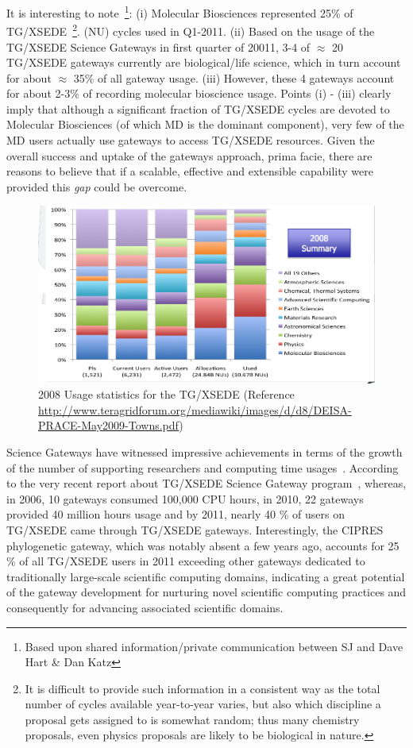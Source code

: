 \documentclass[]{svjour3}
\begin{document}
It is interesting to note~\footnote{Based upon shared
  information/private communication between SJ and Dave Hart \& Dan
  Katz}: (i) Molecular Biosciences represented 25\% of
TG/XSEDE~\footnote{It is difficult to provide such information in a
  consistent way as the total number of cycles available year-to-year
  varies, but also which discipline a proposal gets assigned to is
  somewhat random; thus many chemistry proposals, even physics
  proposals are likely to be biological in nature.}.  (NU) cycles used
in Q1-2011. (ii) Based on the usage of the TG/XSEDE Science Gateways
in first quarter of 20011, 3-4 of $\approx$ 20 TG/XSEDE gateways
currently are biological/life science, which in turn account for about
$\approx$ 35\% of all gateway usage. (iii) However, these 4 gateways
account for about 2-3\% of recording molecular bioscience
usage. Points (i) - (iii) clearly imply that although a significant
fraction of TG/XSEDE cycles are devoted to Molecular Biosciences (of
which MD is the dominant component), very few of the MD users actually
use gateways to access TG/XSEDE resources.  Given the overall success
and uptake of the gateways approach, prima facie, there are reasons to
believe that if a scalable, effective and extensible capability were
provided this {\it gap} could be overcome.
 
\begin{figure}
 \centering
\includegraphics[scale=0.27]{figures/teragrid-discipline08}
\caption{\small 2008 Usage statistics for the TG/XSEDE (Reference
  \url{http://www.teragridforum.org/mediawiki/images/d/d8/DEISA-PRACE-May2009-Towns.pdf})}
  \label{tg2008}
\end{figure}

Science Gateways have witnessed impressive achievements in terms of
the growth of the number of supporting researchers and computing time
usages~\cite{gce11-nancy}. According to the very recent report about
TG/XSEDE Science Gateway program~\cite{gce11-nancy}, whereas, in 2006,
10 gateways consumed 100,000 CPU hours, in 2010, 22 gateways provided
40 million hours usage and by 2011, nearly 40 \% of users on TG/XSEDE
came through TG/XSEDE gateways. Interestingly, the CIPRES phylogenetic
gateway, which was notably absent a few years ago, accounts for 25 \%
of all TG/XSEDE users in 2011 exceeding other gateways dedicated to
traditionally large-scale scientific computing domains, indicating a
great potential of the gateway development for nurturing novel
scientific computing practices and consequently for advancing
associated scientific domains.
\end{document}
